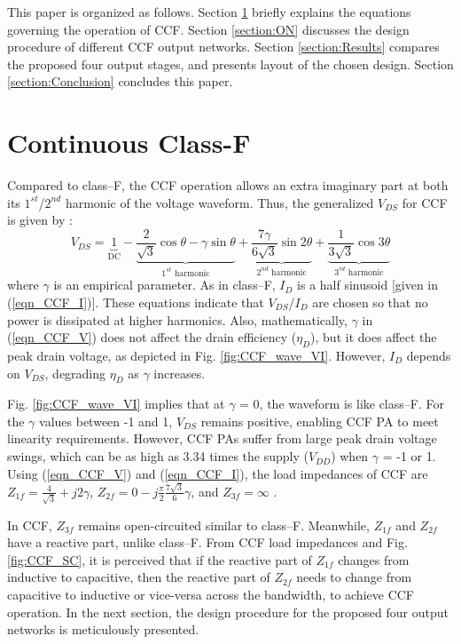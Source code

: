 \documentclass[conference]{IEEEtran}
\begin{document}
This paper is organized as follows. Section \ref{section:CCF} briefly explains the equations governing the operation of CCF. Section \ref{section:ON} discusses the design procedure of different CCF output networks. Section \ref{section:Results} compares the proposed four output stages, and presents layout of the chosen design. Section \ref{section:Conclusion} concludes this paper.

\section{Continuous Class-F}
\label{section:CCF}
\vspace{-0.05in}
Compared to class--F, the CCF operation allows an extra imaginary part at both its $1^{st}$/$2^{nd}$ harmonic of the voltage waveform. Thus, the generalized $V_{DS}$ for CCF is given by \cite{ECCF_Carrubba}:
\begin{equation}
V_{DS}=\underbrace{1}_{\text{DC}}-\underbrace{\frac{2}{\sqrt{3}} \cos \theta-\gamma \sin \theta}_{\text{$1^{st}$ harmonic}}+\underbrace{\frac{7 \gamma}{6 \sqrt{3}} \sin 2 \theta}_{\text{$2^{nd}$ harmonic}}+\underbrace{\frac{1}{3 \sqrt{3}} \cos 3 \theta}_{\text{$3^{rd}$ harmonic}}
\label{eqn_CCF_V}
\end{equation}
where $\gamma$ is an empirical parameter. As in class--F, $I_{D}$ is a half sinusoid [given in (\ref{eqn_CCF_I})]. These equations indicate that $V_{DS}$/$I_{D}$ are chosen so that no power is dissipated at higher harmonics. Also, mathematically, $\gamma$ in (\ref{eqn_CCF_V}) does not affect the drain efficiency ($\eta_D$), but it does affect the peak drain voltage, as depicted in Fig. \ref{fig:CCF_wave_VI}. However, $I_{D}$ depends on $V_{DS}$, degrading $\eta_D$ as $\gamma$ increases.


Fig. \ref{fig:CCF_wave_VI} implies that at $\gamma$ = 0, the waveform is like class--F. For the $\gamma$ values between -1 and 1, $V_{DS}$ remains positive, enabling CCF PA to meet linearity requirements. However, CCF PAs suffer from large peak drain voltage swings, which can be as high as 3.34 times the supply ($V_{DD}$) when $\gamma$ = -1 or 1. Using (\ref{eqn_CCF_V}) and (\ref{eqn_CCF_I}), the load impedances of CCF  are $Z_{1f}=\frac{4}{\sqrt{3}}+j 2 \gamma$, $Z_{2f}=0-j \frac{\pi}{2} \frac{7 \sqrt{3}}{6} \gamma$, and $Z_{3f}=\infty$ \cite{CCFDesign_ali}.


In CCF, $Z_{3f}$ remains open-circuited similar to class--F. Meanwhile, $Z_{1f}$ and $Z_{2f}$ have a reactive part, unlike class--F. From CCF load impedances and Fig. \ref{fig:CCF_SC}, it is perceived that if the reactive part of $Z_{1f}$ changes from inductive to capacitive, then the reactive part of $Z_{2f}$  needs to change from capacitive to inductive or vice-versa across the bandwidth, to achieve CCF operation. In the next section, the design procedure for the proposed four output networks is meticulously presented. 
\end{document}
